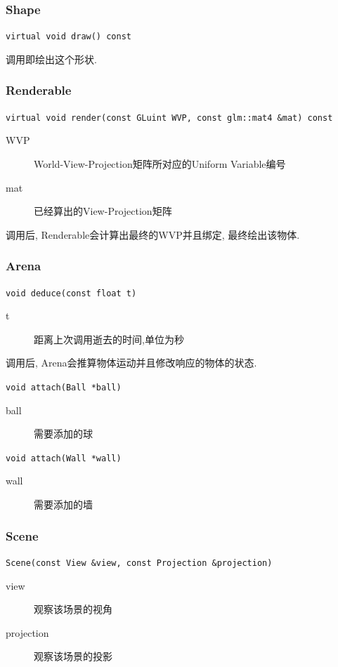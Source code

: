 \documentclass[11pt]{article}
\begin{document}
\subsubsection{Shape}
\label{sec-4-1-1}

\texttt{virtual void draw() const}

调用即绘出这个形状.


\subsubsection{Renderable}
\label{sec-4-1-2}

\texttt{virtual void render(const GLuint WVP, const glm::mat4 \&mat) const}
\begin{description}
\item[{WVP}] World-View-Projection矩阵所对应的Uniform Variable编号
\item[{mat}] 已经算出的View-Projection矩阵
\end{description}

调用后, Renderable会计算出最终的WVP并且绑定, 最终绘出该物体.

\subsubsection{Arena}
\label{sec-4-1-3}

\texttt{void deduce(const float t)}
\begin{description}
\item[{t}] 距离上次调用逝去的时间,单位为秒
\end{description}
调用后, Arena会推算物体运动并且修改响应的物体的状态.



\texttt{void attach(Ball *ball)}
\begin{description}
\item[{ball}] 需要添加的球
\end{description}



\texttt{void attach(Wall *wall)}
\begin{description}
\item[{wall}] 需要添加的墙
\end{description}

\subsubsection{Scene}
\label{sec-4-1-4}

\texttt{Scene(const View \&view, const Projection \&projection)}
\begin{description}
\item[{view}] 观察该场景的视角
\item[{projection}] 观察该场景的投影
\end{description}
\end{document}
